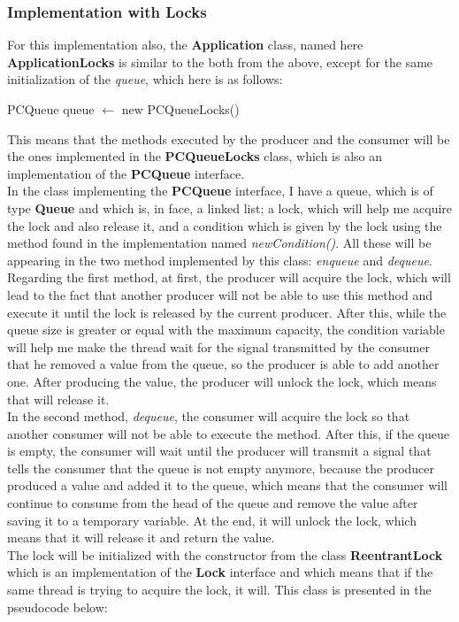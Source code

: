 \documentclass[14pt]{article}
\begin{document}
\subsubsection{Implementation with Locks}
For this implementation also, the \textbf{Application} class, named here \textbf{ApplicationLocks} is similar to the both from the above, except for the same initialization of the \textit{queue}, which here is as follows:
\begin{algorithmic}
\State PCQueue queue $\gets$ new PCQueueLocks()
\end{algorithmic}
This means that the methods executed by the producer and the consumer will be the ones implemented in the \textbf{PCQueueLocks} class, which is also an implementation of the \textbf{PCQueue} interface.
\\In the class implementing the \textbf{PCQueue} interface, I have a queue, which is of type \textbf{Queue} and which is, in face, a linked list; a lock, which will help me acquire the lock and also release it, and a condition which is given by the lock using the method found in the implementation named \textit{newCondition()}. All these will be appearing in the two method implemented by this class: \textit{enqueue} and \textit{dequeue}. 
\\Regarding the first method, at first, the producer will acquire the lock, which will lead to the fact that another producer will not be able to use this method and execute it until the lock is released by the current producer. After this, while the queue size is greater or equal with the maximum capacity, the condition variable will help me make the thread wait for the signal transmitted by the consumer that he removed a value from the queue, so the producer is able to add another one. After producing the value, the producer will unlock the lock, which means that will release it.
\\In the second method, \textit{dequeue}, the consumer will acquire the lock so that another consumer will not be able to execute the method. After this, if the queue is empty, the consumer will wait until the producer will transmit a signal that tells the consumer that the queue is not empty anymore, because the producer produced a value and added it to the queue, which means that the consumer will continue to consume from the head of the queue and remove the value after saving it to a temporary variable. At the end, it will unlock the lock, which means that it will release it and return the value.
\\The lock will be initialized with the constructor from the class \textbf{ReentrantLock} which is an implementation of the \textbf{Lock} interface and which means that if the same thread is trying to acquire the lock, it will. This class is presented in the pseudocode below:
\end{document}
